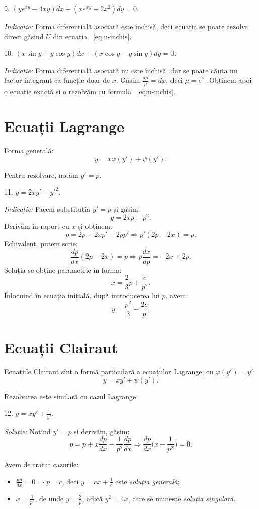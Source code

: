 \documentclass[11pt,a4paper]{article}
\theoremstyle{dotless}
\theoremstyle{dotlessdr}
\begin{document}
\vspace{1cm}

9. $(ye^{xy} - 4xy) dx + (xe^{xy} - 2x^2) dy = 0$.

\emph{Indicație:} Forma diferențială asociată este închisă, deci ecuația se poate rezolva
direct găsind $U$ din ecuația ~\eqref{eq:u-inchis}.

\vspace{1cm}

10. $(x \sin y + y \cos y) dx + (x \cos y - y \sin y) dy = 0$.

\emph{Indicație:} Forma diferențială asociată nu este închisă, dar se poate căuta
un factor integrant ca funcție doar de $x$. Găsim $\frac{d\mu}{\mu} = dx$,
deci $\mu = e^x$. Obținem apoi o ecuație exactă și o rezolvăm cu formula ~\eqref{eq:u-inchis}.


\section*{Ecuații Lagrange}

Forma generală:
\[
  y = x\varphi(y') + \psi(y').
\]

Pentru rezolvare, notăm $y' = p$.

11. $y = 2xy' - {y'}^2$.

\emph{Indicație:} Facem substituția $y' = p$ și găsim:
\[
  y = 2xp - p^2.
\]
Derivăm în raport cu $x$ și obținem:
\[
  p = 2p + 2xp' - 2pp' \Rightarrow p'(2p - 2x) = p.
\]
Echivalent, putem scrie:
\[
  \frac{dp}{dx}(2p - 2x) = p \Rightarrow p\frac{dx}{dp} = -2x + 2p.
\]
Soluția se obține parametric în forma:
\[
  x = \frac{2}{3}p + \frac{c}{p^2}.
\]
Înlocuind în ecuația inițială, după introducerea lui $p$, avem:
\[
  y = \frac{p^2}{3} + \frac{2c}{p}.
\]


\section*{Ecuații Clairaut}

Ecuațiile Clairaut sînt o formă particulară a ecuațiilor Lagrange, cu $\varphi(y') = y'$:
\[
  y = xy' + \psi(y').
\]

Rezolvarea este similară cu cazul Lagrange.

\vspace{1cm}

12. $y = xy' + \frac{1}{y'}$.

\emph{Soluție:} Notînd $y' = p$ și derivăm, găsim:
\[
  p = p + x \frac{dp}{dx} - \frac{1}{p^2} \frac{dp}{dx} \Rightarrow %
  \frac{dp}{dx} \Big( x - \frac{1}{p^2} \Big) = 0.
\]

Avem de tratat cazurile:
\begin{itemize}
\item $\frac{dp}{dx} = 0 \Rightarrow p = c$, deci $y = cx + \frac{1}{c}$ este
  \emph{soluția generală};
\item $x = \frac{1}{p^2}$, de unde $y = \frac{2}{p}$, adică $y^2 = 4x$, care
  se numește \emph{soluția singulară}.
\end{itemize}
\end{document}
